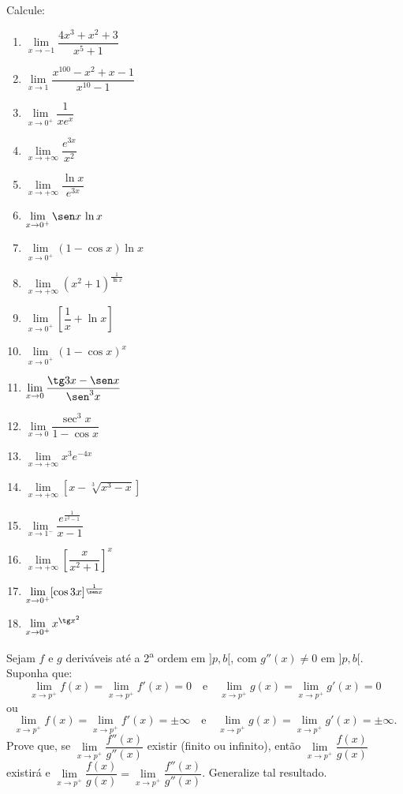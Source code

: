 \begin{exercicio}[1]
Calcule:
\begin{enumerate}[label=\alph*)]
    \item $\lim\limits_{x \to -1} \dfrac{4x^3 + x^2 + 3}{x^5 + 1}$
    \item $\lim\limits_{x \to 1} \dfrac{x^{100} - x^2 + x - 1}{x^{10} - 1}$
    \item $\lim\limits_{x \to 0^+} \dfrac{1}{x e^x}$
    \item $\lim\limits_{x \to +\infty} \dfrac{e^{3x}}{x^2}$
    \item $\lim\limits_{x \to +\infty} \dfrac{\ln x}{e^{3x}}$
    \item $\lim\limits_{x \to 0^+} \sen x \, \ln x$
    \item $\lim\limits_{x \to 0^+} (1 - \cos x)\ln x$
    \item $\lim\limits_{x \to +\infty} (x^2 + 1)^{\frac{1}{\ln x}}$
    \item $\lim\limits_{x \to 0^+} \left[\dfrac{1}{x} + \ln x\right]$
    \item $\lim\limits_{x \to 0^+} (1 - \cos x)^x$
    \item $\lim\limits_{x \to 0} \dfrac{\tg 3x - \sen x}{\sen^3 x}$
    \item $\lim\limits_{x \to 0} \dfrac{\sec^3 x}{1 - \cos x}$
    \item $\lim\limits_{x \to +\infty} x^3 e^{-4x}$
    \item $\lim\limits_{x \to +\infty} [x - \sqrt[3]{x^3 - x}]$
    \item $\lim\limits_{x \to 1^-} \dfrac{e^{\frac{1}{x^2 - 1}}}{x - 1}$
    \item $\lim\limits_{x \to +\infty} \left[\dfrac{x}{x^2 + 1}\right]^x$
    \item $\lim\limits_{x \to 0^+} [\cos 3x]^{\frac{1}{\sen x}}$
    \item $\lim\limits_{x \to 0^+} x^{\tg x^2}$
\end{enumerate}
\end{exercicio}

\begin{exercicio}[2]
Sejam $f$ e $g$ deriváveis até a 2\textsuperscript{a} ordem em $]p, b[$, com $g''(x) \neq 0$ em $]p, b[$. Suponha que:
\[
\lim_{x \to p^+} f(x) = \lim_{x \to p^+} f'(x) = 0 \quad\text{e}\quad \lim_{x \to p^+} g(x) = \lim_{x \to p^+} g'(x) = 0
\]
ou
\[
\lim_{x \to p^+} f(x) = \lim_{x \to p^+} f'(x) = \pm\infty \quad\text{e}\quad \lim_{x \to p^+} g(x) = \lim_{x \to p^+} g'(x) = \pm\infty.
\]
Prove que, se $\lim\limits_{x \to p^+} \dfrac{f''(x)}{g''(x)}$ existir (finito ou infinito), então $\lim\limits_{x \to p^+} \dfrac{f(x)}{g(x)}$ existirá e $\lim\limits_{x \to p^+} \dfrac{f(x)}{g(x)} = \lim\limits_{x \to p^+} \dfrac{f''(x)}{g''(x)}$. Generalize tal resultado.
\end{exercicio}

